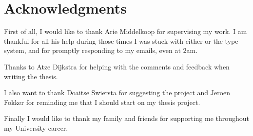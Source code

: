 \newpage
\thispagestyle{headings}
\mbox{}

\newpage
\thispagestyle{headings}
\mbox{}

\section*{Acknowledgments}
First of all, I would like to thank Arie Middelkoop for supervising my work. I am thankful for all his help during those times I was stuck with either \rcore or the type system, and for promptly responding to my emails, even at 2am.

Thanks to Atze Dijkstra for helping with the comments and feedback when writing the thesis.

I also want to thank Doaitse Swiersta for suggesting the project and Jeroen Fokker for reminding me that I should start on my thesis project.

Finally I would like to thank my family and friends for supporting me throughout my University career.

